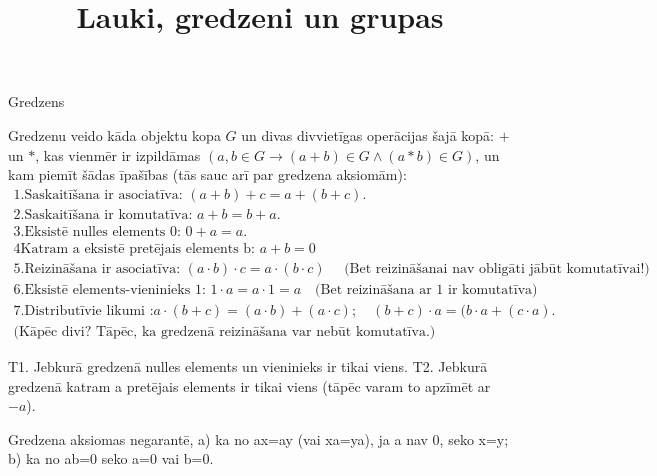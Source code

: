 \documentclass[12pt]{article}
\title{Lauki, gredzeni un grupas}
\author{}
\date{}
\begin{document}
\maketitle

Gredzens

Gredzenu veido kāda objektu kopa $G$ un divas divvietīgas operācijas šajā kopā: $+$ un $*$, kas vienmēr ir izpildāmas $( a,b \in G \rightarrow  (a + b) \in G \wedge (a * b) \in G)$, un kam piemīt šādas īpašības (tās sauc arī par gredzena aksiomām):
\begin{gather*}
1. \text{Saskaitīšana ir asociatīva: } (a+b)+c=a+(b+c). \\
2. \text{Saskaitīšana ir komutatīva: } a+b=b+a. \\
3. \text{Eksistē nulles elements 0: } 0+a=a. \\
4 \text{Katram a eksistē pretējais elements b: } a + b = 0 \\
5. \text{Reizināšana ir asociatīva: } (a \cdot b) \cdot c = a \cdot (b \cdot c)  \quad \text{ (Bet reizināšanai nav obligāti jābūt komutatīvai!) }\\
6. \text{Eksistē elements-vieninieks 1: } 1 \cdot a = a \cdot 1= a \quad \text{(Bet reizināšana ar 1 ir komutatīva)} \\
7. \text{Distributīvie likumi :} a \cdot (b+c)=(a \cdot b)+(a \cdot c); \quad (b+c) \cdot a=(b \cdot a +(c \cdot a). \\
\text{(Kāpēc divi? Tāpēc, ka gredzenā reizināšana var nebūt komutatīva.)}
\end{gather*}


T1. Jebkurā gredzenā nulles elements un vieninieks ir tikai viens.
T2. Jebkurā gredzenā katram a pretējais elements ir tikai viens (tāpēc varam to apzīmēt ar $
-a$).

Gredzena aksiomas negarantē, a) ka no ax=ay (vai xa=ya), ja a nav 0, seko x=y; b) ka no ab=0 seko a=0 vai b=0.

\pagebreak


\begin{gather*}
\end{gather*}

\begin{comment}
\end{comment}
\end{document}
